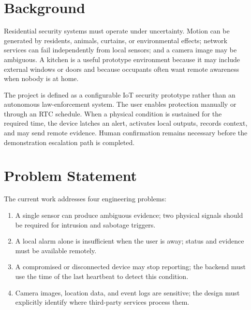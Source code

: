 \documentclass[11pt,a4paper]{report}
\begin{document}
\section{Background}
Residential security systems must operate under uncertainty. Motion can be
generated by residents, animals, curtains, or environmental effects; network
services can fail independently from local sensors; and a camera image may be
ambiguous. A kitchen is a useful prototype environment because it may include
external windows or doors and because occupants often want remote awareness
when nobody is at home.

The project is defined as a configurable IoT security prototype rather than an
autonomous law-enforcement system. The user enables protection manually or
through an RTC schedule. When a physical condition is sustained for the
required time, the device latches an alert, activates local outputs, records
context, and may send remote evidence. Human confirmation remains necessary
before the demonstration escalation path is completed.

\section{Problem Statement}
The current work addresses four engineering problems:
\begin{enumerate}
  \item A single sensor can produce ambiguous evidence; two physical signals
        should be required for intrusion and sabotage triggers.
  \item A local alarm alone is insufficient when the user is away; status and
        evidence must be available remotely.
  \item A compromised or disconnected device may stop reporting; the backend
        must use the time of the last heartbeat to detect this condition.
  \item Camera images, location data, and event logs are sensitive; the design
        must explicitly identify where third-party services process them.
\end{enumerate}
\end{document}
